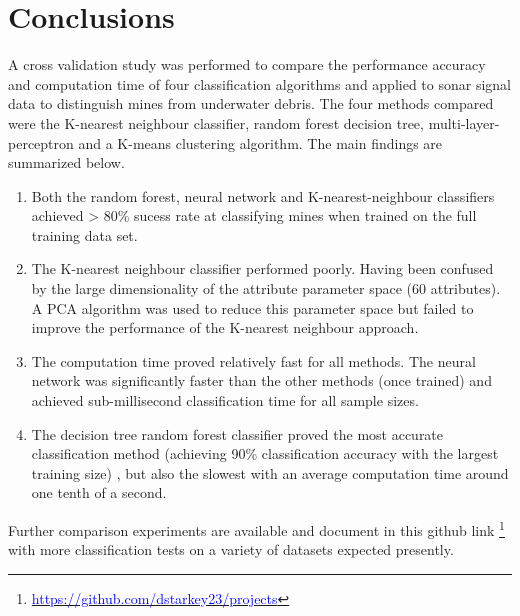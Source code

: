 \documentclass[10pt]{article}
\begin{document}
\section{Conclusions}
A cross validation study was performed to compare the performance accuracy and computation time of four classification algorithms and applied to sonar signal data to distinguish mines from underwater debris. The four methods compared were the K-nearest neighbour classifier, random forest decision tree, multi-layer-perceptron and a K-means clustering algorithm. The main findings are summarized below. 
\begin{enumerate}
\item Both the random forest, neural network and K-nearest-neighbour classifiers achieved > 80\% sucess rate at classifying mines when trained on the full training data set.

\item The K-nearest neighbour classifier performed poorly. Having been confused by the large dimensionality of the attribute parameter space (60 attributes). A PCA algorithm was used to reduce this parameter space but failed to improve the performance of the K-nearest neighbour approach.

\item The computation time proved relatively fast for all methods. The neural network was significantly faster than the other methods (once trained) and achieved sub-millisecond classification time for all sample sizes.

\item The decision tree random forest classifier proved the most accurate classification method (achieving 90\% classification accuracy with the largest training size) , but also the slowest with an average computation time around one tenth of a second.
\end{enumerate}



Further comparison experiments are available and document in this github link \footnote{\href{ https://github.com/dstarkey23/projects}{\textcolor{blue}{https://github.com/dstarkey23/projects}}} with more classification tests on a variety of datasets expected presently. 
\end{document}
